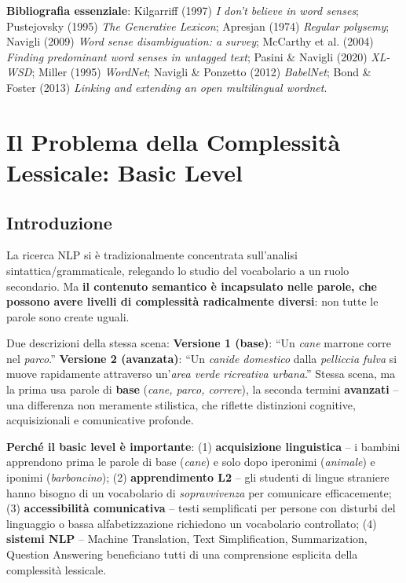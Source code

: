 \documentclass[12pt,a4paper]{article}
\begin{document}
\textbf{Bibliografia essenziale}: Kilgarriff (1997) \emph{I don't believe in word senses}; Pustejovsky (1995) \emph{The Generative Lexicon}; Apresjan (1974) \emph{Regular polysemy}; Navigli (2009) \emph{Word sense disambiguation: a survey}; McCarthy et al. (2004) \emph{Finding predominant word senses in untagged text}; Pasini \& Navigli (2020) \emph{XL-WSD}; Miller (1995) \emph{WordNet}; Navigli \& Ponzetto (2012) \emph{BabelNet}; Bond \& Foster (2013) \emph{Linking and extending an open multilingual wordnet}.

\section{Il Problema della Complessit\`a Lessicale: Basic Level}

\subsection{Introduzione}

La ricerca NLP si \`e tradizionalmente concentrata sull'analisi sintattica/grammaticale, relegando lo studio del vocabolario a un ruolo secondario. Ma \textbf{il contenuto semantico \`e incapsulato nelle parole, che possono avere livelli di complessit\`a radicalmente diversi}: non tutte le parole sono create uguali.

\begin{examplebox}
Due descrizioni della stessa scena: \textbf{Versione 1 (base)}: ``Un \textit{cane} marrone corre nel \textit{parco}.'' \textbf{Versione 2 (avanzata)}: ``Un \textit{canide domestico} dalla \textit{pelliccia fulva} si muove rapidamente attraverso un'\textit{area verde ricreativa urbana}.'' Stessa scena, ma la prima usa parole di \textbf{base} (\textit{cane, parco, correre}), la seconda termini \textbf{avanzati} -- una differenza non meramente stilistica, che riflette distinzioni cognitive, acquisizionali e comunicative profonde.
\end{examplebox}

\textbf{Perch\'e il basic level \`e importante}: (1) \textbf{acquisizione linguistica} -- i bambini apprendono prima le parole di base (\textit{cane}) e solo dopo iperonimi (\textit{animale}) e iponimi (\textit{barboncino}); (2) \textbf{apprendimento L2} -- gli studenti di lingue straniere hanno bisogno di un vocabolario di \emph{sopravvivenza} per comunicare efficacemente; (3) \textbf{accessibilit\`a comunicativa} -- testi semplificati per persone con disturbi del linguaggio o bassa alfabetizzazione richiedono un vocabolario controllato; (4) \textbf{sistemi NLP} -- Machine Translation, Text Simplification, Summarization, Question Answering beneficiano tutti di una comprensione esplicita della complessit\`a lessicale.
\end{document}
